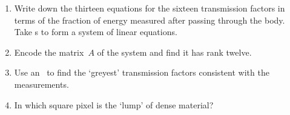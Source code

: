\begin{exercise}
\setbox\ajrqrbox\hbox{}%
\marginajrbox%

\begin{enumerate}
\item Write down the thirteen equations for the sixteen transmission factors in terms of the fraction of  energy measured after passing through the body.
Take s to form a system of linear equations.

\fixwrapenum

\item Encode the matrix~\(A\) of the system and find it has rank twelve.
\item Use an \svd\ to find the `greyest' transmission factors consistent with the measurements.
\item In which square pixel is the `lump' of dense material?
\end{enumerate}
\end{exercise}










